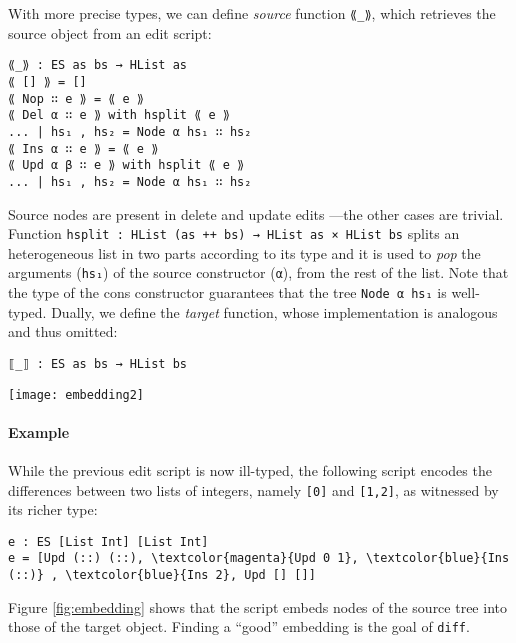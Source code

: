 \documentclass{sigplanconf}
\theoremstyle{plain}
\begin{document}
With more precise types, we can define \emph{source} function
\texttt{⟪\_⟫}, which retrieves the source object from an edit script:

\begin{verbatim}
⟪_⟫ : ES as bs → HList as
⟪ [] ⟫ = []
⟪ Nop ∷ e ⟫ = ⟪ e ⟫
⟪ Del α ∷ e ⟫ with hsplit ⟪ e ⟫
... | hs₁ , hs₂ = Node α hs₁ ∷ hs₂
⟪ Ins α ∷ e ⟫ = ⟪ e ⟫
⟪ Upd α β ∷ e ⟫ with hsplit ⟪ e ⟫
... | hs₁ , hs₂ = Node α hs₁ ∷ hs₂
\end{verbatim}
%
Source nodes are present in delete and update edits ---the other cases
are trivial.
% 
Function \texttt{hsplit : HList (as ++ bs) → HList as × HList bs}
splits an heterogeneous list in two parts according to its type and it
is used to \emph{pop} the arguments (\texttt{hs₁}) of the source
constructor (\texttt{α}), from the rest of the list.
%
Note that the type of the cons constructor guarantees that the tree
\texttt{Node α hs₁} is well-typed.
%
Dually, we define the \emph{target} function, whose implementation is
analogous and thus omitted:
\begin{verbatim}
⟦_⟧ : ES as bs → HList bs
\end{verbatim}

\begin{figure*}[!t]
\centering
\texttt{[image: embedding2]}
\caption{The embedding induced by \texttt{[Upd (::) (::), \textcolor{magenta}{Upd 0 1}, \textcolor{blue}{Ins (::)} , \textcolor{blue}{Ins 2}, Upd [] []]}}
\label{fig:embedding}
\end{figure*}

\paragraph{Example}
While the previous edit script is now ill-typed, the following script
encodes the differences between two lists of integers, namely \texttt{[0]} and \texttt{[1,2]}, as witnessed by its richer type:
\begin{Verbatim}[commandchars=\\\{\}]
e : ES [List Int] [List Int]
e = [Upd (::) (::), \textcolor{magenta}{Upd 0 1}, \textcolor{blue}{Ins (::)} , \textcolor{blue}{Ins 2}, Upd [] []]
\end{Verbatim}

Figure \ref{fig:embedding} shows that the script embeds nodes of the
source tree into those of the target object.
%
Finding a ``good'' embedding is the goal of \texttt{diff}.
\end{document}
